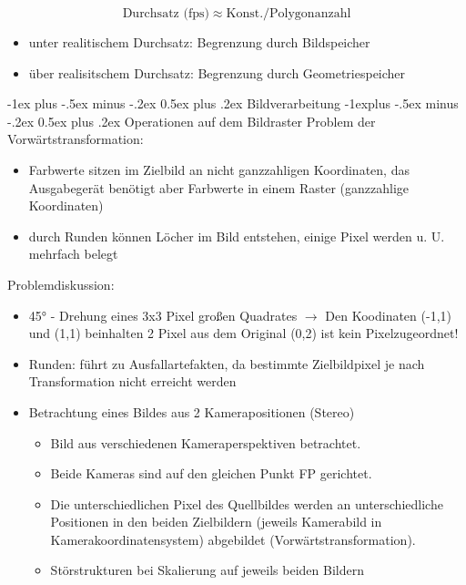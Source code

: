 \documentclass[10pt,landscape]{article}
\makeatletter
\renewcommand{\section}{\@startsection{section}{1}{0mm}%
                                {-1ex plus -.5ex minus -.2ex}%
                                {0.5ex plus .2ex}%
                                {\normalfont\large\bfseries}}
\renewcommand{\subsection}{\@startsection{subsection}{2}{0mm}%
                                {-1explus -.5ex minus -.2ex}%
                                {0.5ex plus .2ex}%
                                {\normalfont\normalsize\bfseries}}
\makeatother
\begin{document}
\begin{multicols}{3}
$$\text{Durchsatz (fps)} \approx \text{Konst.} / \text{Polygonanzahl}$$
\begin{itemize}
  \item unter realitischem Durchsatz: Begrenzung durch Bildspeicher
  \item über realisitschem Durchsatz: Begrenzung durch Geometriespeicher
\end{itemize}


\section{Bildverarbeitung}
\subsection{Operationen auf dem Bildraster}
Problem der Vorwärtstransformation:
\begin{itemize}
  \item Farbwerte sitzen im Zielbild an nicht ganzzahligen Koordinaten, das Ausgabegerät benötigt aber Farbwerte in einem Raster (ganzzahlige Koordinaten)
  \item durch Runden können Löcher im Bild entstehen, einige Pixel werden u. U. mehrfach belegt
\end{itemize}


Problemdiskussion: 
\begin{itemize}
  \item 45° - Drehung eines 3x3 Pixel großen Quadrates $\rightarrow$ Den Koodinaten (-1,1) und (1,1) beinhalten 2 Pixel aus dem Original (0,2) ist kein Pixelzugeordnet!
  \item Runden: führt zu Ausfallartefakten, da bestimmte Zielbildpixel je nach Transformation nicht erreicht werden
  \item Betrachtung eines Bildes aus 2 Kamerapositionen (Stereo)
        \begin{itemize}
          \item Bild aus verschiedenen Kameraperspektiven betrachtet.
          \item Beide Kameras sind auf den gleichen Punkt FP gerichtet.
          \item Die unterschiedlichen Pixel des Quellbildes werden an unterschiedliche Positionen in den beiden Zielbildern (jeweils Kamerabild in Kamerakoordinatensystem) abgebildet (Vorwärtstransformation).
          \item Störstrukturen bei Skalierung auf jeweils beiden Bildern
        \end{itemize}
\end{itemize}


\end{multicols}
\end{document}

